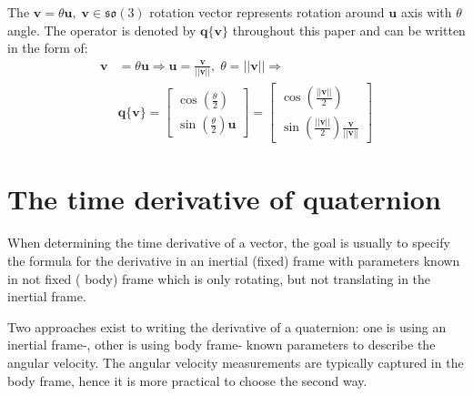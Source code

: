 The $\mathbf{v}=\theta\mathbf{u},\;\mathbf{v}\in\mathfrak{so}(3)$ rotation vector represents rotation around $\mathbf{u}$ axis with $\theta$ angle. The operator is denoted by $\mathbf{q}\{\mathbf{v}\}$ throughout this paper and can be written in the form of:
\begin{equation}
\begin{aligned}
    \mathbf{v}&=\theta\mathbf{u}\Rightarrow\mathbf{u}=\frac{\mathbf{v}}{||\mathbf{v}||},\;\theta=||\mathbf{v}||\Rightarrow\\&\mathbf{q}\{\mathbf{v} \}=\begin{bmatrix}
        \cos\left(\frac{\theta}{2}\right) \\ \sin\left(\frac{\theta}{2}\right)\mathbf{u}
    \end{bmatrix}=\begin{bmatrix}
        \cos\left(\frac{||\mathbf{v}||}{2}\right) \\
        \sin\left(\frac{||\mathbf{v}||}{2}\right)\frac{\mathbf{v}}{||\mathbf{v}||}
    \end{bmatrix}
\end{aligned}
\label{eq:rotvec2quat}
\end{equation}

\section{The time derivative of quaternion}\label{app:time-der-of-quat}

When determining the time derivative of a vector, the goal is usually to specify the formula for the derivative in an inertial (fixed) frame with parameters known in not fixed (\eg{} body) frame which is only rotating, but not translating in the inertial frame.

Two approaches exist to writing the derivative of a quaternion: one is using an inertial frame-, other is using body frame- known parameters to describe the angular velocity. The angular velocity measurements are typically captured in the body frame, hence it is more practical to choose the second way. 


